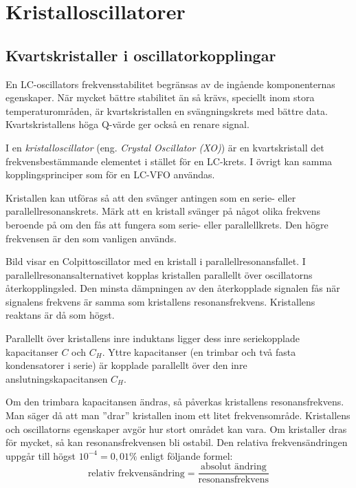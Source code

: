 \section{Kristalloscillatorer}
\label{kristalloscillator}

\subsection{Kvartskristaller i oscillator\-kopplingar}

En LC-oscillators frekvensstabilitet begränsas av de ingående
komponenternas egenskaper.
När mycket bättre stabilitet än så krävs, speciellt inom stora
temperaturområden, är kvartskristallen en svängningskrets med bättre data.
Kvartskristallens höga Q-värde ger också en renare signal.


I en \emph{kristalloscillator} (eng. \emph{Crystal Oscillator (XO)}) är en
kvartskristall det frekvensbestämmande elementet i stället för en LC-krets.
I övrigt kan samma kopplingsprinciper som för en LC-VFO användas.

Kristallen kan utföras så att den svänger antingen som en serie- eller
parallellresonanskrets.
Märk att en kristall svänger på något olika frekvens beroende på om den fås
att fungera som serie- eller parallellkrets.
Den högre frekvensen är den som vanligen används.

Bild  visar en Colpittoscillator med en kristall i
parallellresonansfallet.
I parallellresonansalternativet kopplas kristallen parallellt över
oscillatorns återkopplingsled.
Den minsta dämpningen av den återkopplade signalen fås när signalens frekvens
är samma som kristallens resonansfrekvens.
Kristallens reaktans är då som högst.

Parallellt över kristallens inre induktans ligger dess inre
seriekopplade kapacitanser \(C\) och \(C_H\).
Yttre kapacitanser (en trimbar och två fasta kondensatorer i serie) är kopplade
parallellt över den inre anslutningskapacitansen \(C_H\).

Om den trimbara kapacitansen ändras, så påverkas kristallens resonansfrekvens.
Man säger då att man ''drar'' kristallen inom ett litet frekvensområde.
Kristallens och oscillatorns egenskaper avgör hur stort området kan vara.
Om kristaller dras för mycket, så kan resonansfrekvensen bli ostabil.
Den relativa frekvensändringen uppgår till högst \(10^{-4} = 0,01\%\)
enligt följande formel:
%
\[
\text{relativ frekvensändring} =
\frac{\text{absolut ändring}}{\text{resonansfrekvens}}
\]

